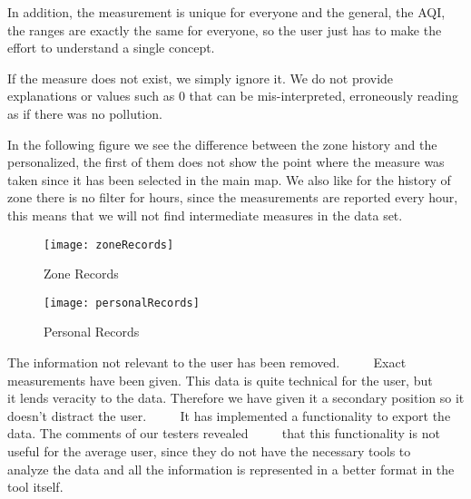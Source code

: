 In addition, the measurement is unique for everyone and the general, the AQI, the ranges are exactly the same for everyone, so the user just has to make the effort to understand a single concept.

If the measure does not exist, we simply ignore it. We do not provide explanations or values such as 0 that can be mis-interpreted, erroneously reading as if there was no pollution.


In the following figure we see the difference between the zone history and the personalized, the first of them does not show
the point where the measure was taken since it has been selected in the main map. We also like for the history of
zone there is no filter for hours, since the measurements are reported every hour, this means that we will not find
intermediate measures in the data set.
 
\begin{figure}[ht]
    \centering
    \texttt{[image: zoneRecords]}
    \caption{Zone Records}
\end{figure}
\begin{figure}[ht]
    \centering
    \texttt{[image: personalRecords]}
    \caption{Personal Records}
\end{figure}


\begin{itemize}
    \done The information not relevant to the user has been removed.
         \crossed Exact measurements have been given. This data is quite technical for the user, but 
         it lends veracity to the data. Therefore we have given it a secondary position so it doesn't distract the user.
         \crossed It has implemented a functionality to export the data. The comments of our testers revealed
         that this functionality is not useful for the average user, since they do not have the necessary tools to
         analyze the data and all the information is represented in a better format in the tool itself.
    
\end{itemize}
 \newpage